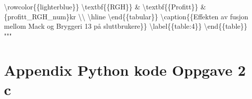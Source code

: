 \documentclass[
  12pt,
  a4paper,
  DIV=11,
  numbers=noendperiod]{scrartcl}
\newenvironment{Shaded}{\begin{snugshade}}{\end{snugshade}}
\newcommand{\CharTok}[1]{\textcolor[rgb]{0.13,0.47,0.30}{#1}}
\newcommand{\NormalTok}[1]{\textcolor[rgb]{0.00,0.23,0.31}{#1}}
\newcommand{\SpecialCharTok}[1]{\textcolor[rgb]{0.37,0.37,0.37}{#1}}
\newcommand{\VerbatimStringTok}[1]{\textcolor[rgb]{0.13,0.47,0.30}{#1}}
\begin{document}
\begin{Shaded}
\begin{Highlighting}[]
\VerbatimStringTok{\textbackslash{}rowcolor}\CharTok{\{\{}\VerbatimStringTok{lighterblue}\CharTok{\}\}}\VerbatimStringTok{ \textbackslash{}textbf}\CharTok{\{\{}\VerbatimStringTok{RGH}\CharTok{\}\}}\VerbatimStringTok{ \& \textbackslash{}textbf}\CharTok{\{\{}\VerbatimStringTok{Profitt}\CharTok{\}\}}\VerbatimStringTok{ \& }\SpecialCharTok{\{}\NormalTok{profitt\_RGH\_num}\SpecialCharTok{\}}\VerbatimStringTok{kr \textbackslash{}\textbackslash{} \textbackslash{}hline}
\VerbatimStringTok{\textbackslash{}end}\CharTok{\{\{}\VerbatimStringTok{tabular}\CharTok{\}\}}
\VerbatimStringTok{\textbackslash{}caption}\CharTok{\{\{}\VerbatimStringTok{Effekten av fusjon mellom Mack og Bryggeri 13 på sluttbrukere}\CharTok{\}\}}
\VerbatimStringTok{\textbackslash{}label}\CharTok{\{\{}\VerbatimStringTok{table:4}\CharTok{\}\}}
\VerbatimStringTok{\textbackslash{}end}\CharTok{\{\{}\VerbatimStringTok{table}\CharTok{\}\}}
\VerbatimStringTok{"""}
\end{Highlighting}
\end{Shaded}

\clearpage

\section {Appendix Python kode Oppgave 2 c}
\end{document}
